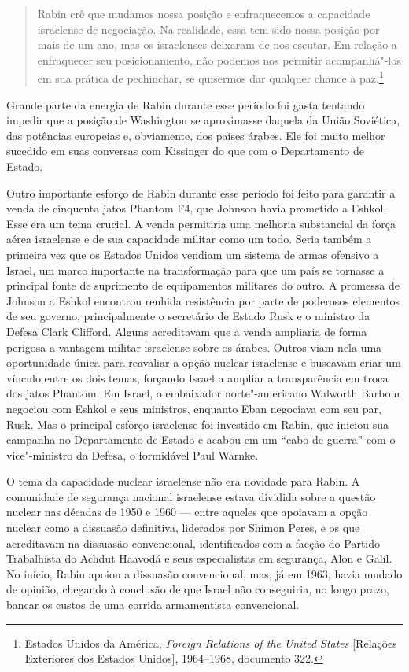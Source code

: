 \begin{quote}
Rabin crê que mudamos nossa posição e
enfraquecemos a capacidade israelense de negociação. Na realidade, essa
tem sido nossa posição por mais de um ano, mas os israelenses deixaram
de nos escutar. Em relação a enfraquecer seu posicionamento, não podemos nos
permitir acompanhá"-los em sua prática de pechinchar, se quisermos dar
qualquer chance à paz.\footnote{Estados Unidos da América, \emph{Foreign Relations of the United States} 
{[}Relações Exteriores dos Estados Unidos{]}, 1964--1968, documento 322.}
\end{quote}

Grande parte da energia de Rabin durante esse período foi gasta tentando
impedir que a posição de Washington se aproximasse daquela da União
Soviética, das potências europeias e, obviamente, dos países árabes. Ele
foi muito melhor sucedido em suas conversas com Kissinger do que com o
Departamento de Estado.

Outro importante esforço de Rabin durante esse período foi feito para
garantir a venda de cinquenta jatos Phantom F4, que Johnson havia
prometido a Eshkol. Esse era um tema crucial. A venda permitiria uma melhoria
substancial da força aérea israelense e de sua capacidade militar como
um todo. Seria também a primeira vez que os Estados Unidos vendiam um
sistema de armas ofensivo a Israel, um marco importante na transformação
para que um país se tornasse a principal fonte de suprimento de equipamentos militares do outro.
A promessa de Johnson a Eshkol encontrou renhida resistência por
parte de poderosos elementos de seu governo, principalmente o secretário
de Estado Rusk e o ministro da Defesa Clark Clifford. Alguns acreditavam
que a venda ampliaria de forma perigosa a vantagem militar israelense
sobre os árabes. Outros viam nela uma oportunidade única para reavaliar
a opção nuclear israelense e buscavam criar um vínculo entre os dois
temas, forçando Israel a ampliar a transparência em troca dos jatos
Phantom. Em Israel, o embaixador norte"-americano Walworth Barbour
negociou com Eshkol e seus ministros, enquanto Eban negociava com seu
par, Rusk. Mas o principal esforço israelense foi investido em Rabin,
que iniciou sua campanha no Departamento de Estado e acabou em um ``cabo
de guerra'' com o vice"-ministro da Defesa, o formidável Paul Warnke.

O tema da capacidade nuclear israelense não era novidade para
Rabin. A comunidade de segurança nacional israelense estava dividida
sobre a questão nuclear nas décadas de 1950 e 1960 --- entre aqueles que
apoiavam a opção nuclear como a dissuasão definitiva, liderados por
Shimon Peres, e os que acreditavam na dissuasão convencional,
identificados com a facção do Partido Trabalhista do Achdut Haavodá e
seus especialistas em segurança, Alon e Galil. No início, Rabin apoiou a
dissuasão convencional, mas, já em 1963, havia mudado de opinião, chegando
à conclusão de que Israel não conseguiria, no longo prazo, bancar os custos
de uma corrida armamentista convencional.

